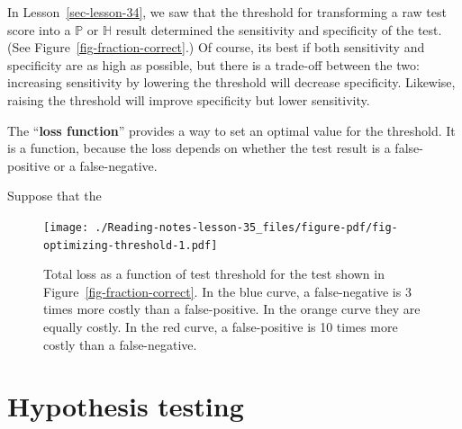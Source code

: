\documentclass[
  letterpaper,
  DIV=11,
  numbers=noendperiod,
  oneside]{scrreprt}
\begin{document}
\begin{tcolorbox}[enhanced jigsaw, colbacktitle=quarto-callout-warning-color!10!white, breakable, opacitybacktitle=0.6, colback=white, left=2mm, arc=.35mm, colframe=quarto-callout-warning-color-frame, coltitle=black, toprule=.15mm, opacityback=0, leftrule=.75mm, bottomtitle=1mm, toptitle=1mm, titlerule=0mm, title=\textcolor{quarto-callout-warning-color}{\faExclamationTriangle}\hspace{0.5em}{Demonstration: Setting the optimal threshold}, rightrule=.15mm, bottomrule=.15mm]

In Lesson~\ref{sec-lesson-34}, we saw that the threshold for
transforming a raw test score into a \(\mathbb{P}\) or \(\mathbb{H}\)
result determined the sensitivity and specificity of the test. (See
Figure~\ref{fig-fraction-correct}.) Of course, its best if both
sensitivity and specificity are as high as possible, but there is a
trade-off between the two: increasing sensitivity by lowering the
threshold will decrease specificity. Likewise, raising the threshold
will improve specificity but lower sensitivity.

The ``\textbf{loss function}'' provides a way to set an optimal value
for the threshold. It is a function, because the loss depends on whether
the test result is a false-positive or a false-negative.

Suppose that the

\begin{figure}[H]

{\centering \texttt{[image: ./Reading-notes-lesson-35\_files/figure-pdf/fig-optimizing-threshold-1.pdf]}

}

\caption{\label{fig-optimizing-threshold}Total loss as a function of
test threshold for the test shown in Figure~\ref{fig-fraction-correct}.
In the blue curve, a false-negative is 3 times more costly than a
false-positive. In the orange curve they are equally costly. In the red
curve, a false-positive is 10 times more costly than a false-negative.}

\end{figure}

\end{tcolorbox}

\hypertarget{sec-lesson-36}{%
\chapter{Hypothesis testing}\label{sec-lesson-36}}
\end{document}
